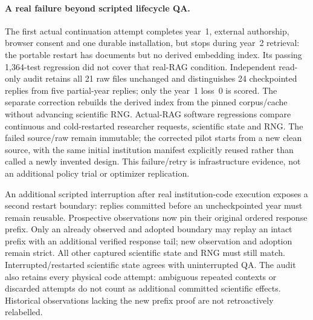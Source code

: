 \paragraph{A real failure beyond scripted lifecycle QA.}
The first actual continuation attempt completes year~1, external authorship,
browser consent and one durable installation, but stops during year~2 retrieval:
the portable restart has documents but no derived embedding index. Its passing
1,364-test regression did not cover that real-RAG condition. Independent read-only
audit retains all 21 raw files unchanged and distinguishes 24 checkpointed replies
from five partial-year replies; only the year~1 loss~0 is scored. The separate
correction rebuilds the derived index from the pinned corpus/cache without
advancing scientific RNG. Actual-RAG software regressions compare continuous
and cold-restarted researcher requests, scientific state and RNG. The failed
source/raw remain immutable; the corrected pilot starts from a new clean source,
with the same initial institution manifest explicitly reused rather than called
a newly invented design. This failure/retry is infrastructure evidence, not an
additional policy trial or optimizer replication.

An additional scripted interruption after real institution-code execution exposes
a second restart boundary: replies committed before an uncheckpointed year must
remain reusable. Prospective observations now pin their original ordered response
prefix. Only an already observed and adopted boundary may replay an intact
prefix with an additional verified response tail; new observation and adoption
remain strict. All other captured scientific state and RNG must still match.
Interrupted/restarted scientific state agrees with uninterrupted QA. The audit
also retains every physical code attempt: ambiguous repeated contexts or discarded
attempts do not count as additional committed scientific effects. Historical
observations lacking the new prefix proof are not retroactively relabelled.

